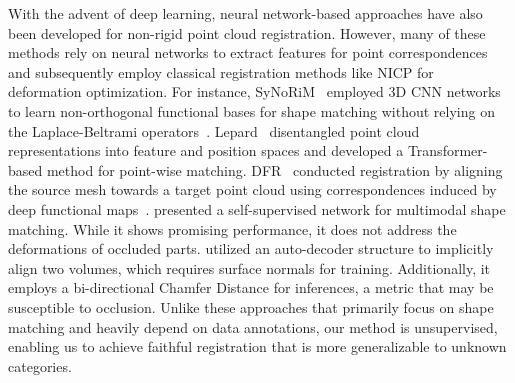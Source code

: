 With the advent of deep learning, neural network-based approaches have also been developed for non-rigid point cloud registration. 
However, many of these methods rely on neural networks to extract features for point correspondences and subsequently employ classical registration methods like NICP for deformation optimization. For instance,   SyNoRiM~\citep{huang2022multiway} employed 3D CNN networks to learn non-orthogonal functional bases for shape matching without relying on the Laplace-Beltrami operators~\citep{ovsjanikov2012functional}. Lepard~\citep{li2022lepard} disentangled point cloud representations into feature and position spaces and developed a Transformer-based method for point-wise matching. DFR~\citep{sun2024non} conducted registration by aligning the source mesh towards a target point cloud using correspondences induced by deep functional maps~\citep{litany2017deep}. \cite{cao2023self} presented a self-supervised network for multimodal shape matching. While it shows promising performance, it does not address the deformations of occluded parts. \cite{sundararaman2022implicit} utilized an auto-decoder structure to implicitly align two volumes, which requires surface normals for training. Additionally, it employs a bi-directional Chamfer Distance for inferences, a metric that may be susceptible to occlusion. Unlike these approaches that primarily focus on shape matching and heavily depend on data annotations, our method is unsupervised, enabling us to achieve faithful registration that is more generalizable to unknown categories. 






